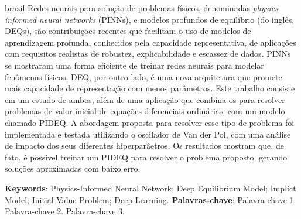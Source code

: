 \begin{resumo}[Resumo]
	\SingleSpacing
	\begin{otherlanguage*}{brazil}
	    Redes neurais para solução de problemas físicos, denominadas \emph{physics-informed neural networks} (PINNs), e modelos profundos de equilíbrio (do inglês, DEQs), são contribuições recentes que facilitam o uso de modelos de aprendizagem profunda, conhecidos pela capacidade representativa, de aplicações com requisitos realistas de robustez, explicabilidade e escassez de dados.
	    PINNs se mostraram uma forma eficiente de treinar redes neurais para modelar fenômenos físicos.
	    DEQ, por outro lado, é uma nova arquitetura que promete mais capacidade de representação com menos parâmetros.
	    Este trabalho consiste em um estudo de ambos, além de uma aplicação que combina-os para resolver problemas de valor inicial de equações diferenciais ordinárias, com um modelo chamado PIDEQ.
	    A abordagem proposta para resolver esse tipo de problema foi implementada e testada utilizando o oscilador de Van der Pol, com uma análise de impacto dos seus diferentes hiperparâetros.
	    Os resultados mostram que, de fato, é possível treinar um PIDEQ para resolver o problema proposto, gerando soluções aproximadas com baixo erro.
		
	    \textbf{Keywords}: Physics-Informed Neural Network; Deep Equilibrium Model; Implict Model; Initial-Value Problem; Deep Learning.
	    \textbf{Palavras-chave}: Palavra-chave 1. Palavra-chave 2. Palavra-chave 3.
	\end{otherlanguage*}
\end{resumo}

% 
%
%  

